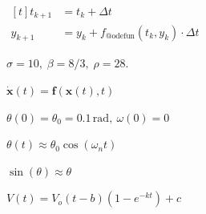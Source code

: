 \documentclass[multi={mymath,myarray},border=1pt]{standalone}
\newenvironment{mymath}{$\displaystyle}{$}
\newenvironment{myarray}{$\begin{aligned}[t]}{\end{aligned}$}
\begin{document}
\begin{myarray}
  t_{k+1} &= t_{k} + \Delta t &\\
  y_{k+1} &= y_k + f_{\text{@odefun}}(t_k, y_k) \cdot \Delta t
\end{myarray}

\begin{mymath}
  \sigma = 10, \; \beta = 8/3, \; \rho = 28 .
\end{mymath}

\begin{mymath}
  \mathbf{\dot{x}}(t) = \mathbf{f}(\mathbf{x}(t), t)
\end{mymath}

\begin{mymath}
  \theta(0) = \theta_0 = 0.1 \, \text{rad}, \: \omega(0) = 0
\end{mymath}

\begin{mymath}
  \theta(t) \approx \theta_0 \cos(\omega_n t)
\end{mymath}

\begin{mymath}
\sin(\theta) \approx \theta
\end{mymath}

\begin{mymath}
  V(t) = V_o (t-b)(1-e^{-kt})+c
\end{mymath}
\end{document}
